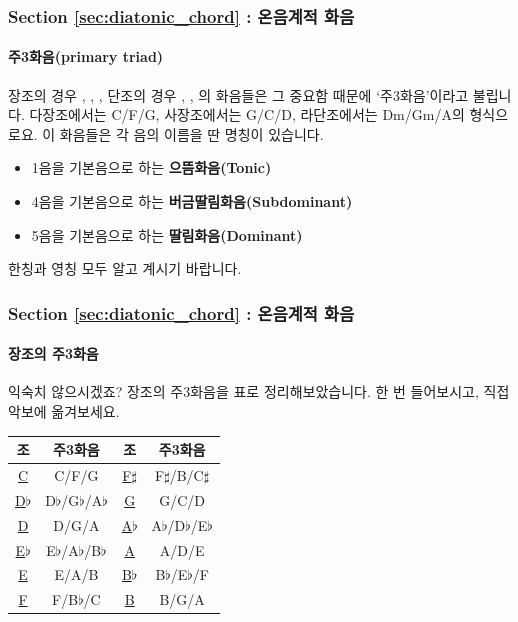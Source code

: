 \documentclass{beamer}
\newcommand{\Rn}[1]{%
	\textup{\uppercase\expandafter{\romannumeral#1}}%
}
\newcommand{\rn}[1]{%
	\textup{\lowercase\expandafter{\romannumeral#1}}%
}
\begin{document}
	\begin{frame}
		\frametitle{Section \ref{sec:diatonic_chord} : 온음계적 화음}
		\framesubtitle{주3화음(primary triad)}
		장조의 경우 \Rn{1}, \Rn{4}, \Rn{5}, 단조의 경우 \rn{1}, \rn{4}, \Rn{5}의 화음들은 그 중요함 때문에 `주3화음'이라고 불립니다. 다장조에서는 C/F/G, 사장조에서는 G/C/D, 라단조에서는 Dm/Gm/A의 형식으로요. 이 화음들은 각 음의 이름을 딴 명칭이 있습니다.
		\begin{itemize}
			\item 1음을 기본음으로 하는 {\bf 으뜸화음(Tonic)}
			\item 4음을 기본음으로 하는 {\bf 버금딸림화음(Subdominant)}
			\item 5음을 기본음으로 하는 {\bf 딸림화음(Dominant)}
		\end{itemize}
		한칭과 영칭 모두 알고 계시기 바랍니다.
	\end{frame}
	
	\begin{frame}
		\frametitle{Section \ref{sec:diatonic_chord} : 온음계적 화음}
		\framesubtitle{장조의 주3화음}
		익숙치 않으시겠죠? 장조의 주3화음을 표로 정리해보았습니다. 한 번 들어보시고, 직접 악보에 옮겨보세요.
		\begin{table}
			\begin{tabular}{||c|c||c|c||}
				\hline
				 조 & 주3화음 & 조 & 주3화음 \\ \hline
				 {\color{cyan}\href{run:res/mp3/10/chord/primary_major_triad_C.mp3}{C}} & C/F/G & {\color{cyan}\href{run:res/mp3/10/chord/primary_major_triad_F_sharp.mp3}{F$\sharp$}} & F$\sharp$/B/C$\sharp$ \\ \hline
				 {\color{cyan}\href{run:res/mp3/10/chord/primary_major_triad_D_flat.mp3}{D$\flat$}} & D$\flat$/G$\flat$/A$\flat$& {\color{cyan}\href{run:res/mp3/10/chord/primary_major_triad_G.mp3}{G}} & G/C/D \\ \hline
				 {\color{cyan}\href{run:res/mp3/10/chord/primary_major_triad_D.mp3}{D}} & D/G/A &  {\color{cyan}\href{run:res/mp3/10/chord/primary_major_triad_A_flat.mp3}{A$\flat$}} & A$\flat$/D$\flat$/E$\flat$ \\ \hline
				 {\color{cyan}\href{run:res/mp3/10/chord/primary_major_triad_E_flat.mp3}{E$\flat$}} & E$\flat$/A$\flat$/B$\flat$& {\color{cyan}\href{run:res/mp3/10/chord/primary_major_triad_A.mp3}{A}} & A/D/E \\ \hline
				 {\color{cyan}\href{run:res/mp3/10/chord/primary_major_triad_E.mp3}{E}} & E/A/B & {\color{cyan}\href{run:res/mp3/10/chord/primary_major_triad_B_flat.mp3}{B$\flat$}} & B$\flat$/E$\flat$/F \\ \hline
				 {\color{cyan}\href{run:res/mp3/10/chord/primary_major_triad_F.mp3}{F}} & F/B$\flat$/C & {\color{cyan}\href{run:res/mp3/10/chord/primary_major_triad_B.mp3}{B}} & B/G/A \\ \hline 
			\end{tabular}
		\end{table}
	\end{frame}
	
\end{document}
